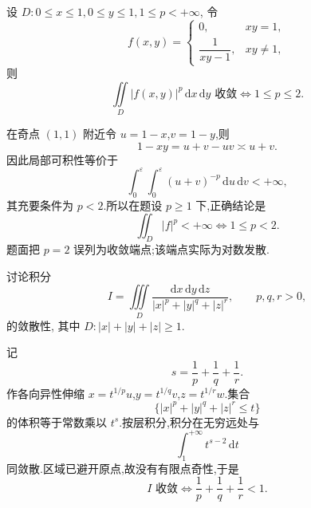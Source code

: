 \begin{example}
    设 $D:0\leq x\leq1,0\leq y\leq1,1\leq p<+\infty$, 令
    \[
        f(x,y)=
        \begin{cases}
            0,               & xy=1,   \\
            \dfrac{1}{xy-1}, & xy\ne1,
        \end{cases}
    \]
    则
    \[
        \displaystyle\iint\limits_D|f(x,y)|^p\,\mathrm{d}x\,\mathrm{d}y\text{ 收敛}
        \iff1\leq p\leq2.
    \]
\end{example}
\exampleblank

\begin{solution}
    在奇点 $(1,1)$ 附近令 $u=1-x$,$v=1-y$,则
    \[
        1-xy=u+v-uv\asymp u+v.
    \]
    因此局部可积性等价于
    \[
        \displaystyle\int_0^\varepsilon\!\int_0^\varepsilon(u+v)^{-p}\,\mathrm{d}u\,\mathrm{d}v<+\infty,
    \]
    其充要条件为 $p<2$.所以在题设 $p\geq1$ 下,正确结论是
    \[
        \displaystyle\iint_D|f|^p<+\infty\iff1\leq p<2.
    \]
    题面把 $p=2$ 误列为收敛端点;该端点实际为对数发散.
\end{solution}

\begin{example}
    讨论积分
    \[
        I=\iiint\limits_D\dfrac{\mathrm{d}x\,\mathrm{d}y\,\mathrm{d}z}{|x|^p+|y|^q+|z|^r},
        \qquad p,q,r>0,
    \]
    的敛散性, 其中 $D:|x|+|y|+|z|\geq1$.
\end{example}
\exampleblank

\begin{solution}
    记
    \[
        s=\dfrac{1}{p}+\dfrac{1}{q}+\dfrac{1}{r}.
    \]
    作各向异性伸缩 $x=t^{1/p}u$,$y=t^{1/q}v$,$z=t^{1/r}w$.集合
    \[
        \{|x|^p+|y|^q+|z|^r\leq t\}
    \]
    的体积等于常数乘以 $t^s$.按层积分,积分在无穷远处与
    \[
        \displaystyle\int_1^{+\infty}t^{s-2}\,\mathrm{d}t
    \]
    同敛散.区域已避开原点,故没有有限点奇性,于是
    \[
        I\text{ 收敛}\iff \dfrac{1}{p}+\dfrac{1}{q}+\dfrac{1}{r}<1.
    \]
\end{solution}
